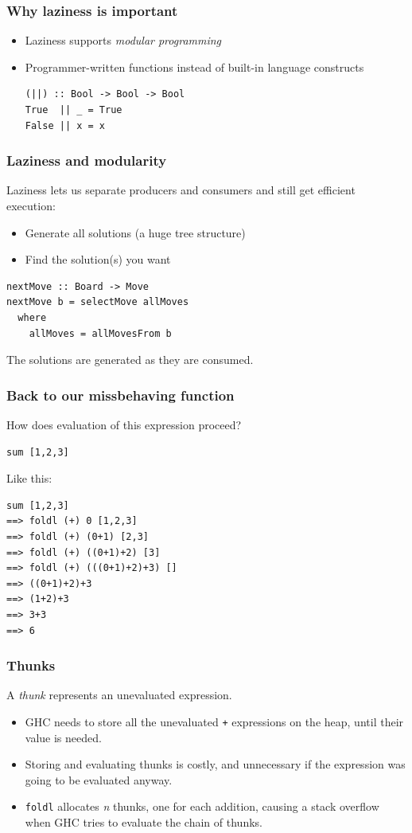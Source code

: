 \documentclass{beamer}
\begin{document}
\begin{frame}[fragile]
  \frametitle{Why laziness is important}

  \begin{itemize}
  \item Laziness supports \emph{modular programming}
  \item Programmer-written functions instead of built-in language
    constructs
    \begin{lstlisting}
(||) :: Bool -> Bool -> Bool
True  || _ = True
False || x = x
    \end{lstlisting}
  \end{itemize}
\end{frame}

\begin{frame}[fragile]
  \frametitle{Laziness and modularity}

  Laziness lets us separate producers and consumers and still get
  efficient execution:
  \begin{itemize}
  \item Generate all solutions (a huge tree structure)
  \item Find the solution(s) you want
  \end{itemize}

  \begin{lstlisting}
nextMove :: Board -> Move
nextMove b = selectMove allMoves
  where
    allMoves = allMovesFrom b
  \end{lstlisting}

  The solutions are generated as they are consumed.
\end{frame}

\begin{frame}[fragile]
\frametitle{Back to our missbehaving function}
How does evaluation of this expression proceed?
\begin{lstlisting}
sum [1,2,3]
\end{lstlisting}

Like this:
\begin{verbatim}
sum [1,2,3]
==> foldl (+) 0 [1,2,3]
==> foldl (+) (0+1) [2,3]
==> foldl (+) ((0+1)+2) [3]
==> foldl (+) (((0+1)+2)+3) []
==> ((0+1)+2)+3
==> (1+2)+3
==> 3+3
==> 6
\end{verbatim}
\end{frame}

\begin{frame}
  \frametitle{Thunks}

  A \emph{thunk} represents an unevaluated expression.

\begin{itemize}
\item GHC needs to store all the unevaluated \lstinline!+! expressions
  on the heap, until their value is needed.
\item Storing and evaluating thunks is costly, and unnecessary if the
  expression was going to be evaluated anyway.
\item \lstinline!foldl! allocates \emph{n} thunks, one for each
  addition, causing a stack overflow when GHC tries to evaluate the
  chain of thunks.
\end{itemize}
\end{frame}
\end{document}

